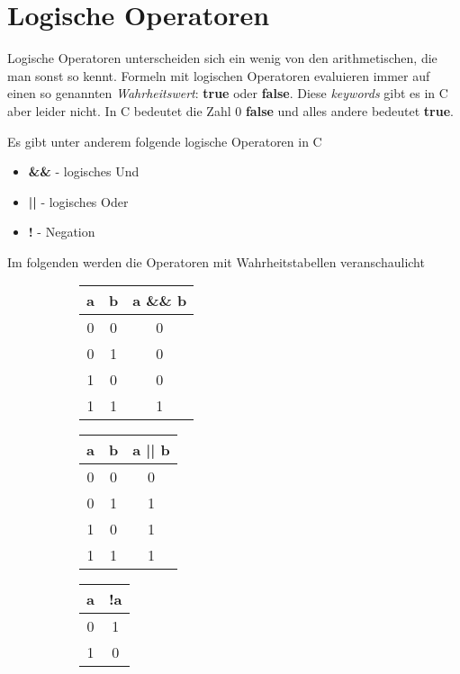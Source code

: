 \documentclass[c_worksheet.tex]{subfiles}
\begin{document}
\section{Logische Operatoren} 


Logische Operatoren unterscheiden sich ein wenig von den arithmetischen, die man sonst so kennt. Formeln mit logischen Operatoren evaluieren immer auf einen so genannten \emph{Wahrheitswert}: \textbf{true} oder \textbf{false}. Diese \emph{keywords} gibt es in C aber leider nicht. In C bedeutet die Zahl \(0\) \textbf{false} und alles andere bedeutet \textbf{true}.

Es gibt unter anderem folgende logische Operatoren in C

\begin{itemize}
	\item \textbf{\&\&} - logisches Und
	\item \textbf{||} - logisches Oder
	\item \textbf{!}  - Negation
\end{itemize}

Im folgenden werden die Operatoren mit Wahrheitstabellen veranschaulicht

\begin{figure}[H]
\begin{center}
\begin{subfigure}[b]{0.3\textwidth}
\centering
\begin{tabular}{ c | c | c }
a & b & a \&\& b \\
\hline
\hline
0 & 0 & 0 \\
\hline
0 & 1 & 0 \\
\hline
1 & 0 & 0 \\
\hline
1 & 1 & 1 \\
\end{tabular}
\end{subfigure}
\begin{subfigure}[b]{0.3\textwidth}
\centering
\begin{tabular}{ c | c | c }
a & b & a || b \\
\hline
\hline
0 & 0 & 0 \\
\hline
0 & 1 & 1 \\
\hline
1 & 0 & 1 \\
\hline
1 & 1 & 1 \\
\end{tabular}
\end{subfigure}
\begin{subfigure}[b]{0.3\textwidth}
\centering
\begin{tabular}{ c | c }
a & !a \\
\hline
\hline
0 & 1 \\
\hline
1 & 0 \\
\end{tabular}
\end{subfigure}
\end{center}
\end{figure}
\end{document}
